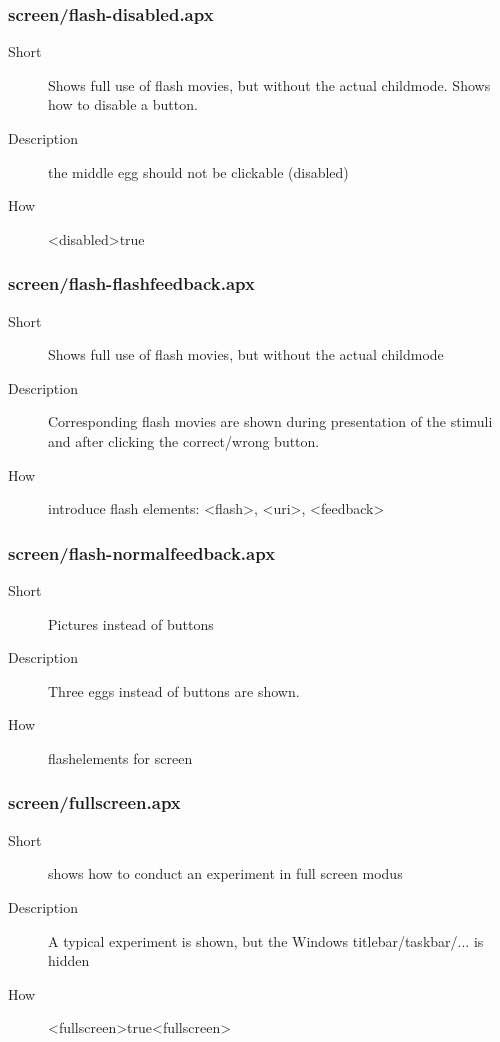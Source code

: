 \subsubsection{screen/flash-disabled.apx}
\begin{description}
\item[Short] 
 Shows full use of flash movies, but without the actual childmode. Shows how to disable a button.
\item[Description] 
 the middle egg should not be clickable (disabled)
\item[How] 
 \textless{}disabled\textgreater{}true
\end{description}

\subsubsection{screen/flash-flashfeedback.apx}
\begin{description}
\item[Short] 
 Shows full use of flash movies, but without the actual childmode
\item[Description] 
 Corresponding flash movies are shown during presentation of the stimuli and after clicking the correct/wrong button.
\item[How] 
 introduce flash elements: \textless{}flash\textgreater{}, \textless{}uri\textgreater{}, \textless{}feedback\textgreater{}
\end{description}

\subsubsection{screen/flash-normalfeedback.apx}
\begin{description}
\item[Short] 
 Pictures instead of buttons
\item[Description] 
 Three eggs instead of buttons are shown.
\item[How] 
 flashelements for screen
\end{description}

\subsubsection{screen/fullscreen.apx}
\begin{description}
\item[Short] 
 shows how to conduct an experiment in full screen modus
\item[Description] 
 A typical experiment is shown, but the Windows titlebar/taskbar/... is hidden
\item[How] 
 \textless{}fullscreen\textgreater{}true\textless{}fullscreen\textgreater{}
\end{description}

